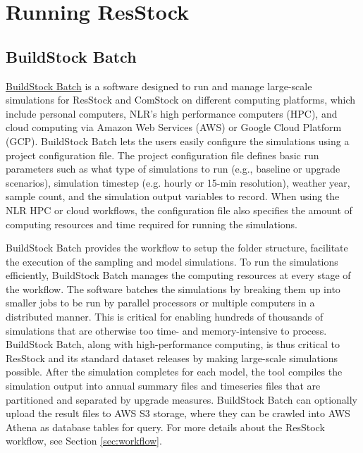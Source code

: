 \chapter{Running ResStock}
\section{BuildStock Batch}
\href{https://github.com/NREL/buildstockbatch/tree/v2023.10.0}{BuildStock Batch} is a software designed to run and manage large-scale simulations for ResStock and ComStock on different computing platforms, which include personal computers, NLR’s high performance computers (HPC), and cloud computing via Amazon Web Services (AWS) or Google Cloud Platform (GCP). BuildStock Batch lets the users easily configure the simulations using a project configuration file. The project configuration file defines basic run parameters such as what type of simulations to run (e.g., baseline or upgrade scenarios), simulation timestep (e.g. hourly or 15-min resolution), weather year, sample count, and the simulation output variables to record.  When using the NLR HPC or cloud workflows, the configuration file also specifies the amount of computing resources and time required for running the simulations.

BuildStock Batch provides the workflow to setup the folder structure, facilitate the execution of the sampling and model simulations. To run the simulations efficiently, BuildStock Batch manages the computing resources at every stage of the workflow. The software batches the simulations by breaking them up into smaller jobs to be run by parallel processors or multiple computers in a distributed manner. This is critical for enabling hundreds of thousands of simulations that are otherwise too time- and memory-intensive to process. BuildStock Batch, along with high-performance computing, is thus critical to ResStock and its standard dataset releases by making large-scale simulations possible. After the simulation completes for each model, the tool compiles the simulation output into annual summary files and timeseries files that are partitioned and separated by upgrade measures. BuildStock Batch can optionally upload the result files to AWS S3 storage, where they can be crawled into AWS Athena as database tables for query.  For more details about the ResStock workflow, see Section \ref{sec:workflow}.


